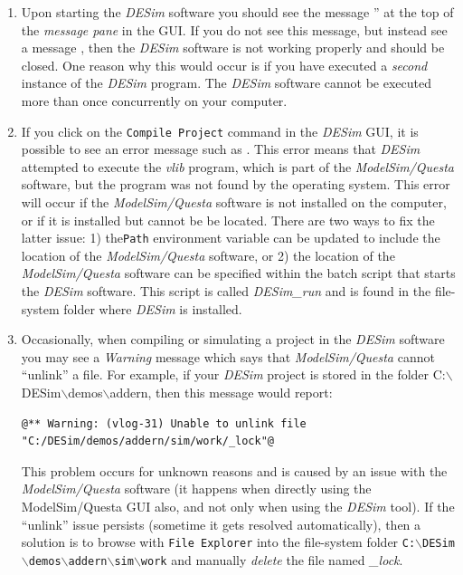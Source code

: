 \begin{enumerate}
\item Upon starting the {\it DESim} software you should see the message 
'' at the top of the {\it message pane} in the GUI. If you do 
not see this message, but instead see a message , then 
the {\it DESim} software is not working properly and should be closed. One
reason why this would occur is if you have executed a {\it second}
instance of the {\it DESim} program. The {\it DESim} software cannot be
executed more than once concurrently on your computer. 
\item If you click on the \texttt{Compile Project} command in the {\it DESim} GUI, it is
possible to see an error message such as 
. This error means that
{\it DESim} attempted to execute the {\it vlib} program, which is part of the 
{\it ModelSim/Questa} software, but the program was not found by the
operating system. This error will occur if the {\it ModelSim/Questa} software is not installed 
on the computer, or if it is installed but cannot be be located. There are two ways to fix the
latter issue: 1) the\texttt{Path} environment variable can be 
updated to include the location of the {\it ModelSim/Questa} software, or 2) the location of the
{\it ModelSim/Questa} software can be specified within the batch script that starts
the {\it DESim} software. This script is called {\it DESim\_run} and is found
in the file-system folder where {\it DESim} is installed. 
\item Occasionally, when compiling or simulating a project in the {\it DESim} software you may
see a {\it Warning} message which says that {\it ModelSim/Questa} cannot ``unlink'' a file. 
For example, if your {\it DESim} project is stored in the folder
C:$\backslash$DESim$\backslash$demos$\backslash$addern, then this message would report: 

\noindent
\begin{minipage}[h]{18 cm}
\begin{lstlisting}[]
@** Warning: (vlog-31) Unable to unlink file "C:/DESim/demos/addern/sim/work/_lock"@
\end{lstlisting}
\end{minipage}

This problem occurs for unknown reasons and is caused by an issue with the
{\it ModelSim/Questa} software (it happens when directly using the ModelSim/Questa GUI
also, and not only when using the {\it DESim} tool). If the ``unlink'' issue
persists (sometime it gets resolved automatically), then a
solution is to browse with \texttt{File Explorer} into the file-system folder  
\texttt{C:$\backslash$DESim$\backslash$demos$\backslash$addern$\backslash$sim$\backslash$work}
and manually {\it delete} the file named {\it \_lock}.
\end{enumerate}





